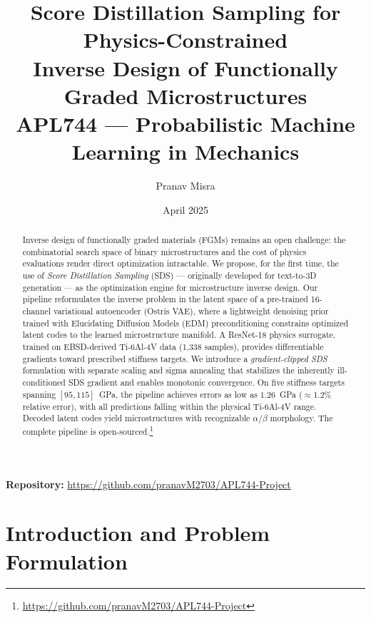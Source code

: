 \documentclass[12pt,a4paper]{article}
\title{%
  \textbf{Score Distillation Sampling for Physics-Constrained\\[2pt]
  Inverse Design of Functionally Graded Microstructures}\\[6pt]
  \large APL744 --- Probabilistic Machine Learning in Mechanics
}
\author{Pranav Misra}
\date{April 2025}
\theoremstyle{definition}
\begin{document}
\maketitle

\begin{center}
  \textbf{Repository:}
  \url{https://github.com/pranavM2703/APL744-Project}
\end{center}
\vspace{0.5em}

\begin{abstract}
Inverse design of functionally graded materials (FGMs) remains an open
challenge: the combinatorial search space of binary microstructures and the
cost of physics evaluations render direct optimization intractable.  We
propose, for the first time, the use of \emph{Score Distillation Sampling}
(SDS) --- originally developed for text-to-3D generation --- as the
optimization engine for microstructure inverse design.
Our pipeline reformulates the inverse problem in the latent space of a
pre-trained 16-channel variational autoencoder (Ostris VAE), where a
lightweight denoising prior trained with Elucidating Diffusion Models (EDM)
preconditioning constrains optimized latent codes to the learned
microstructure manifold.  A ResNet-18 physics surrogate, trained on
EBSD-derived Ti-6Al-4V data (1{,}338 samples), provides differentiable
gradients toward prescribed stiffness targets.  We introduce a
\emph{gradient-clipped SDS} formulation with separate scaling and sigma
annealing that stabilizes the inherently ill-conditioned SDS gradient and
enables monotonic convergence.  On five stiffness targets spanning
$[95, 115]$~GPa, the pipeline achieves errors as low as $1.26$~GPa
($\approx 1.2\%$ relative error), with all predictions falling within the
physical Ti-6Al-4V range.  Decoded latent codes yield microstructures with
recognizable $\alpha/\beta$ morphology.  The complete pipeline is
open-sourced.\footnote{\url{https://github.com/pranavM2703/APL744-Project}}
\end{abstract}

\tableofcontents
\newpage

\section{Introduction and Problem Formulation}
\label{sec:intro}
\end{document}
